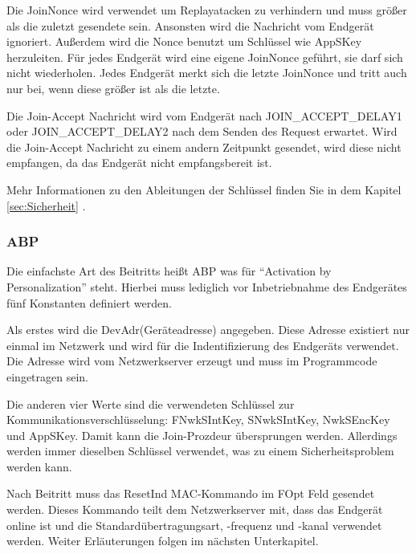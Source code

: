 \documentclass[a4paper, 12pt]{article}
\begin{document}
                Die JoinNonce wird verwendet um Replayatacken zu verhindern und muss größer als die zuletzt 
                gesendete sein. Ansonsten wird die Nachricht vom Endgerät ignoriert. Außerdem wird die Nonce benutzt 
                um Schlüssel wie 
                AppSKey herzuleiten. Für jedes Endgerät wird eine eigene JoinNonce geführt, sie darf sich nicht 
                wiederholen. Jedes Endgerät merkt sich die letzte JoinNonce und tritt auch nur bei, wenn diese größer 
                ist als die letzte.

                Die Join-Accept Nachricht wird vom Endgerät nach JOIN\_ACCEPT\_DELAY1 oder JOIN\_ACCEPT\_DELAY2 nach 
                dem Senden des Request erwartet. Wird die Join-Accept Nachricht zu einem andern Zeitpunkt gesendet,
                wird diese nicht empfangen, da das Endgerät nicht empfangsbereit ist.

                Mehr Informationen zu den Ableitungen der Schlüssel finden Sie in dem Kapitel \ref{sec:Sicherheit} .

            \subsubsection{ABP}
                Die einfachste Art des Beitritts heißt ABP was für ``Activation by Personalization'' steht. 
                Hierbei muss lediglich vor Inbetriebnahme des 
                Endgerätes fünf Konstanten definiert werden. 

                Als erstes wird die DevAdr(Geräteadresse) angegeben. Diese Adresse existiert nur einmal im 
                Netzwerk und wird für die Indentifizierung des Endgeräts verwendet. Die Adresse wird vom Netzwerkserver 
                erzeugt und muss im Programmcode eingetragen sein.

                Die anderen vier Werte sind die verwendeten Schlüssel zur Kommunikationsverschlüsselung:  
                FNwkSIntKey, SNwkSIntKey, NwkSEncKey und AppSKey. Damit kann die Join-Prozdeur 
                übersprungen werden. Allerdings werden immer dieselben Schlüssel verwendet, was zu einem 
                Sicherheitsproblem werden kann.

                Nach Beitritt muss das ResetInd MAC-Kommando im FOpt Feld gesendet werden. Dieses Kommando 
                teilt dem Netzwerkserver mit, dass das Endgerät online ist und die Standardübertragungsart, 
                -frequenz und -kanal verwendet werden. Weiter Erläuterungen folgen im nächsten Unterkapitel.
\end{document}
